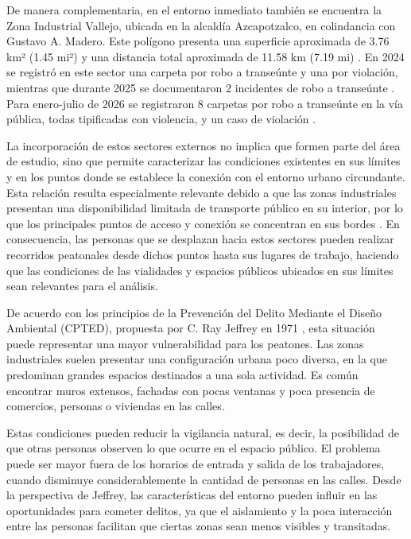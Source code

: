 De manera complementaria, en el entorno inmediato también se encuentra la Zona Industrial Vallejo, ubicada en la alcaldía Azcapotzalco, en colindancia con Gustavo A. Madero. Este polígono presenta una superficie aproximada de 3.76 km² (1.45 mi²) y una distancia total aproximada de 11.58 km (7.19 mi) \cite{googlemaps2026}. En 2024 se registró en este sector una carpeta por robo a transeúnte y una por violación, mientras que durante 2025 se documentaron 2 incidentes de robo a transeúnte \cite{FGJ2025}. Para enero-julio de 2026 se registraron 8 carpetas por robo a transeúnte en la vía pública, todas tipificadas con violencia, y un caso de violación \cite{FGJ2026}.

La incorporación de estos sectores externos no implica que formen parte del área de estudio, sino que permite caracterizar las condiciones existentes en sus límites y en los puntos donde se establece la conexión con el entorno urbano circundante. Esta relación resulta especialmente relevante debido a que las zonas industriales presentan una disponibilidad limitada de transporte público en su interior, por lo que los principales puntos de acceso y conexión se concentran en sus bordes \cite{googlemaps2026}. En consecuencia, las personas que se desplazan hacia estos sectores pueden realizar recorridos peatonales desde dichos puntos hasta sus lugares de trabajo, haciendo que las condiciones de las vialidades y espacios públicos ubicados en sus límites sean relevantes para el análisis.

De acuerdo con los principios de la Prevención del Delito Mediante el Diseño Ambiental (CPTED), propuesta por C. Ray Jeffrey en 1971 \cite{jeffery1971}, esta situación puede representar una mayor vulnerabilidad para los peatones. Las zonas industriales suelen presentar una configuración urbana poco diversa, en la que predominan grandes espacios destinados a una sola actividad. Es común encontrar muros extensos, fachadas con pocas ventanas y poca presencia de comercios, personas o viviendas en las calles.

Estas condiciones pueden reducir la vigilancia natural, es decir, la posibilidad de que otras personas observen lo que ocurre en el espacio público. El problema puede ser mayor fuera de los horarios de entrada y salida de los trabajadores, cuando disminuye considerablemente la cantidad de personas en las calles. Desde la perspectiva de Jeffrey, las características del entorno pueden influir en las oportunidades para cometer delitos, ya que el aislamiento y la poca interacción entre las personas facilitan que ciertas zonas sean menos visibles y transitadas.

